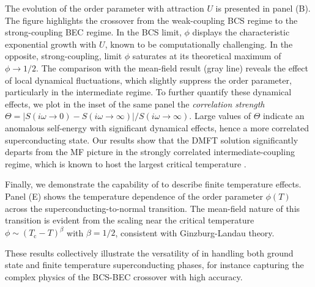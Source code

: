\documentclass[edipack_sp.tex]{subfiles}
\begin{document}
The evolution of the order parameter with attraction $U$ is presented in panel (B). The figure  
highlights the crossover from the weak-coupling BCS regime to the 
strong-coupling BEC regime. In the BCS limit, $\phi$ displays the 
characteristic exponential growth with $U$, known to be 
computationally challenging. In the opposite, strong-coupling, limit 
$\phi$ saturates at its theoretical maximum of $\phi \rightarrow 1/2$. The comparison with the mean-field result 
(gray line) reveals the effect of local dynamical fluctuations, which  slightly suppress the order parameter, particularly in the intermediate regime. 
To further quantify these dynamical effects, we plot in the inset of the same panel the 
{\it correlation strength}~\cite{Amaricci2015PRL,Amaricci2016PRB}
$\Theta=|S(i\omega\to 0)-S(i\omega\to\infty)|/S(i\omega\to\infty)$. 
Large values of $\Theta$ indicate an anomalous self-energy with 
significant dynamical effects, hence a more correlated superconducting state.
Our results show that the DMFT solution significantly departs from the MF picture in the strongly correlated intermediate-coupling regime, which is known to host the largest critical temperature \cite{Toschi2005NJP,Toschi2005PRB}.

Finally, we demonstrate the capability of \NAME to describe finite 
temperature effects. Panel (E) shows the temperature dependence of 
the order parameter $\phi(T)$ across the superconducting-to-normal 
transition. The mean-field nature of this transition is evident from 
the scaling near the critical temperature 
$\phi \sim (T_\mathrm{c} - T)^\beta$ with $\beta = 1/2$, consistent 
with  Ginzburg-Landau theory.

These results collectively illustrate the versatility of \NAME in 
handling both ground state and finite temperature superconducting 
phases, for instance capturing the complex physics of the BCS-BEC crossover with high accuracy.
\end{document}
